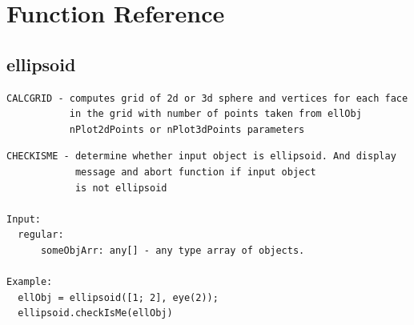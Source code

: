 \documentclass[letterpaper,10pt,english]{sphinxmanual}
\begin{document}
\chapter{Function Reference}
\label{chap_func::doc}\label{chap_func:function-reference}

\section{ellipsoid}
\label{chap_func:ellipsoid}
\begin{Verbatim}[commandchars=\\\{\}]
CALCGRID - computes grid of 2d or 3d sphere and vertices for each face
           in the grid with number of points taken from ellObj
           nPlot2dPoints or nPlot3dPoints parameters
\end{Verbatim}

\begin{Verbatim}[commandchars=\\\{\}]
CHECKISME - determine whether input object is ellipsoid. And display
            message and abort function if input object
            is not ellipsoid

Input:
  regular:
      someObjArr: any[] - any type array of objects.

Example:
  ellObj = ellipsoid([1; 2], eye(2));
  ellipsoid.checkIsMe(ellObj)
\end{Verbatim}
\end{document}
